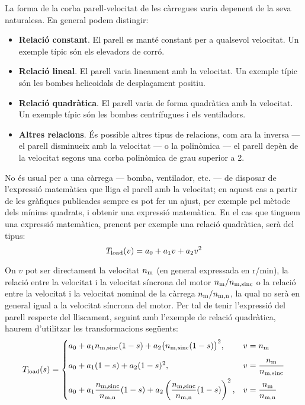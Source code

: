 La forma de la corba parell-velocitat de les càrregues varia depenent de la seva naturalesa. En general podem distingir:
\begin{itemize}
	\item  \textbf{Relació constant}. El parell es manté constant per a qualsevol velocitat. Un exemple típic són els elevadors de corró.
	
	\item  \textbf{Relació lineal}. El parell varia lineament amb la velocitat. Un exemple típic són les bombes helicoidals de desplaçament positiu.
	
	\item  \textbf{Relació quadràtica}. El parell varia de forma  quadràtica  amb la velocitat. Un exemple típic són les bombes centrífugues i els ventiladors.
	
	\item  \textbf{Altres relacions}. És possible altres tipus de relacions, com ara la inversa --- el parell disminueix amb la velocitat --- o la polinòmica --- el parell depèn de la velocitat segons una corba polinòmica de grau superior a 2.
\end{itemize}

No és  usual per a una càrrega --- bomba, ventilador, etc. --- de disposar de l'expressió matemàtica que lliga el parell amb la velocitat; en aquest cas a partir de les gràfiques publicades sempre es pot fer un ajust, per exemple pel mètode dels mínims quadrats, i obtenir una expressió matemàtica. En el cas que tinguem una expressió matemàtica, prenent per exemple una relació quadràtica, serà del tipus:
\begin{equation}
	T_\mathrm{load}(v) = a_0 + a_1 v + a_2 v^2
\end{equation}

On $v$ pot ser directament la velocitat $n_\mathrm{m}$ (en general expressada en r/min),  la relació entre la velocitat i la velocitat síncrona del motor $n_\mathrm{m}/n_\mathrm{m,sinc}$ o la relació entre la velocitat i la velocitat nominal de la càrrega $n_\mathrm{m}/n_\mathrm{m,n}$, la qual no serà en general igual a la velocitat síncrona del motor. Per tal de tenir l'expressió del parell respecte del lliscament,  seguint amb l'exemple de relació quadràtica, haurem d'utilitzar les transformacions següents:
\begin{equation}\label{eq:Tload-v-s}
	T_\mathrm{load}(s) = \begin{cases}
		 a_0 + a_1 n_\mathrm{m,sinc}(1-s) + a_2 \big(n_\mathrm{m,sinc}(1-s)\big)^2,  & v=n_\mathrm{m}  \\[2ex]
		a_0 + a_1 (1-s) + a_2 (1-s)^2, &   
		v =\dfrac{n_\mathrm{m}}{n_\mathrm{m,sinc}} \\[2ex]
		 a_0 + a_1 \dfrac{n_\mathrm{m,sinc}}{n_\mathrm{m,n}}(1-s) + a_2 \left(\dfrac{n_\mathrm{m,sinc}}{n_\mathrm{m,n}}(1-s)\right)^2, &    v = \dfrac{n_\mathrm{m}}{n_\mathrm{m,n}}
	\end{cases}
\end{equation}



